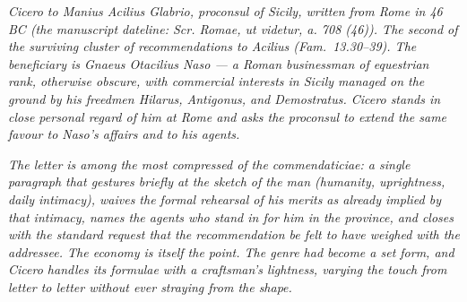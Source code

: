 
\textit{Cicero to Manius Acilius Glabrio, proconsul of
Sicily, written from Rome in 46 BC (the manuscript
dateline: \textit{Scr. Romae, ut videtur, a. 708 (46)}).
The second of the surviving cluster of recommendations
to Acilius (Fam.\ 13.30--39). The beneficiary is Gnaeus
Otacilius Naso --- a Roman businessman of equestrian rank,
otherwise obscure, with commercial interests in Sicily
managed on the ground by his freedmen Hilarus, Antigonus,
and Demostratus. Cicero stands in close personal regard
of him at Rome and asks the proconsul to extend the same
favour to Naso's affairs and to his agents.}

\textit{The letter is among the most compressed of the
\textit{commendaticiae}: a single paragraph that gestures
briefly at the sketch of the man (humanity, uprightness,
daily intimacy), waives the formal rehearsal of his
merits as already implied by that intimacy, names the
agents who stand in for him in the province, and closes
with the standard request that the recommendation be
felt to have weighed with the addressee. The economy is
itself the point. The genre had become a set form, and
Cicero handles its formulae with a craftsman's lightness,
varying the touch from letter to letter without ever
straying from the shape.}
